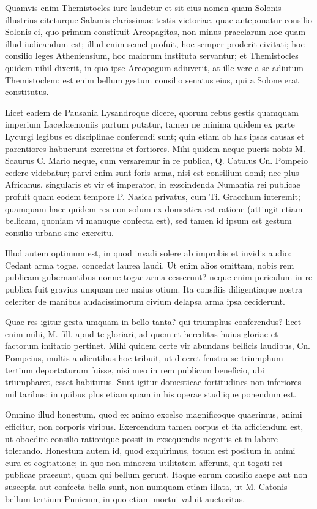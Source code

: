  Quamvis enim Themistocles iure laudetur et sit eius nomen quam Solonis illustrius citcturque Salamis clarissimae testis victoriae, quae anteponatur consilio Solonis ei, quo primum constituit Areopagitas, non minus praeclarum hoc quam illud iudicandum est; illud enim semel profuit, hoc semper proderit civitati; hoc consilio leges Atheniensium, hoc maiorum instituta servantur; et Themistocles quidem nihil dixerit, in quo ipse Areopagum adiuverit, at ille vere a se adiutum Themistoclem; est enim bellum gestum consilio senatus eius, qui a Solone erat constitutus.

 Licet eadem de Pausania Lysandroque dicere, quorum rebus gestis quamquam imperium Lacedaemoniis partum putatur, tamen ne minima quidem ex parte Lycurgi legibus et disciplinae confercndi sunt; quin etiam ob has ipsas causas et parentiores habuerunt exercitus et fortiores. Mihi quidem neque pueris nobis M. Scaurus C. Mario neque, cum versaremur in re publica, Q. Catulus Cn. Pompeio cedere videbatur; parvi enim sunt foris arma, nisi est consilium domi; nec plus Africanus, singularis et vir et imperator, in exscindenda Numantia rei publicae profuit quam eodem tempore P. Nasica privatus, cum Ti. Gracchum interemit; quamquam haec quidem res non solum ex domestica est ratione (attingit etiam bellicam, quoniam vi manuque confecta est), sed tamen id ipsum est gestum consilio urbano sine exercitu.

 Illud autem optimum est, in quod invadi solere ab improbis et invidis audio: Cedant arma togae, concedat laurea laudi. Ut enim alios omittam, nobis rem publicam gubernantibus nonne togae arma cesserunt? neque enim periculum in re publica fuit gravius umquam nec maius otium. Ita consiliis diligentiaque nostra celeriter de manibus audacissimorum civium delapsa arma ipsa ceciderunt.

 Quae res igitur gesta umquam in bello tanta? qui triumphus conferendus? licet enim mihi, M. fill, apud te gloriari, ad quem et hereditas huius gloriae et factorum imitatio pertinet. Mihi quidem certe vir abundans bellicis laudibus, Cn. Pompeius, multis audientibus hoc tribuit, ut diceret frustra se triumphum tertium deportaturum fuisse, nisi meo in rem publicam beneficio, ubi triumpharet, esset habiturus. Sunt igitur domesticae fortitudines non inferiores militaribus; in quibus plus etiam quam in his operae studiique ponendum est.

 Omnino illud honestum, quod ex animo excelso magnificoque quaerimus, animi efficitur, non corporis viribus. Exercendum tamen corpus et ita afficiendum est, ut oboedire consilio rationique possit in exsequendis negotiis et in labore tolerando. Honestum autem id, quod exquirimus, totum est positum in animi cura et cogitatione; in quo non minorem utilitatem afferunt, qui togati rei publicae praesunt, quam qui bellum gerunt. Itaque eorum consilio saepe aut non suscepta aut confecta bella sunt, non numquam etiam illata, ut M. Catonis bellum tertium Punicum, in quo etiam mortui valuit auctoritas.

